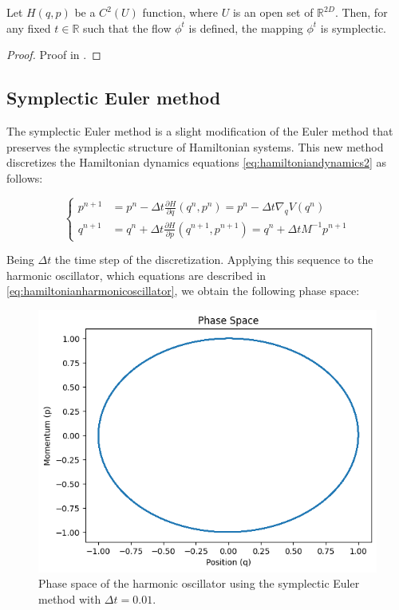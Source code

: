 \documentclass{report}
\begin{document}
\begin{theorem}
	Let \(H(q,p)\) be a \(C^2(U)\) function, where \(U\) is an open set of \(\mathbb{R}^{2D}\). Then, for any fixed \(t \in \mathbb{R}\) such that the flow \(\phi^t\) is defined, the mapping \(\phi^t\) is symplectic.
\end{theorem}

\begin{proof}
	Proof in \cite[Chapter 2.1.2]{stoltz2023introduction}.
\end{proof}



\subsection{Symplectic Euler method}
\label{sec:symplectic_euler_method}

The symplectic Euler method is a slight modification of the Euler method that preserves the symplectic structure of Hamiltonian systems. This new method discretizes the Hamiltonian dynamics equations \eqref{eq:hamiltoniandynamics2} as follows:

\begin{equation}
	\begin{cases}
		p^{n+1} &= p^n - \Delta t \frac{\partial H}{\partial q}(q^n, p^n) = p^n - \Delta t \nabla_q V(q^n) \\
		q^{n+1} &= q^n + \Delta t \frac{\partial H}{\partial p}(q^{n+1}, p^{n+1}) = q^n + \Delta t M^{-1} p^{n+1}
	\end{cases}
	\label{eq:symplecticeuler}
\end{equation}

Being \(\Delta t\) the time step of the discretization. Applying this sequence to the harmonic oscillator, which equations are described in \eqref{eq:hamiltonianharmonicoscillator}, we obtain the following phase space:

\begin{figure}[H]
	\centering
	\includegraphics[width=0.5\linewidth]{./Figures/Sympletic/eulerphase.png}
	\caption{Phase space of the harmonic oscillator using the symplectic Euler method with \(\Delta t = 0.01\).}
	\label{fig:eulerphase}
\end{figure}
\end{document}
